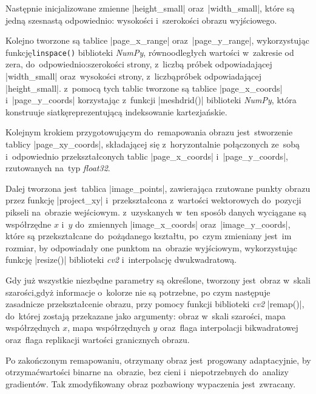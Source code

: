 Następnie inicjalizowane zmienne \pyth|height_small| oraz~\pyth|width_small|, które są jedną szesnastą odpowiednio: wysokości i~szerokości obrazu wyjściowego.

Kolejno tworzone są tablice \pyth|page_x_range| oraz~\pyth|page_y_range|, wykorzystując funkcję\linebreak \lstinline|linspace()| biblioteki \textit{NumPy}, równoodległych wartości w~zakresie od zera, do~odpowiednio:\linebreak szerokości strony, z~liczbą próbek odpowiadającej \pyth|width_small| oraz~wysokości strony, z~liczbą\linebreak próbek odpowiadającej \pyth|height_small|. z~pomocą tych tablic tworzone są tablice \pyth|page_x_coords| i~\pyth|page_y_coords| korzystając z~funkcji \pyth|meshdrid()| biblioteki \textit{NumPy}, która konstruuje siatkę\linebreak reprezentującą indeksowanie kartezjańskie.

Kolejnym krokiem przygotowującym do~remapowania obrazu jest~stworzenie tablicy \linebreak \pyth|page_xy_coords|, składającej się z~horyzontalnie połączonych ze~sobą i~odpowiednio przekształconych tablic \pyth|page_x_coords| i~\pyth|page_y_coords|, rzutowanych na~typ \textit{float32}.

Dalej tworzona jest~tablica \pyth|image_points|, zawierająca rzutowane punkty obrazu przez funkcję \pyth|project_xy| i~przekształcona z~wartości wektorowych do~pozycji pikseli na~obrazie wejściowym. z~uzyskanych w~ten sposób danych wyciągane są współrzędne $x$ i~$y$ do~zmiennych \pyth|image_x_coords| oraz~\pyth|image_y_coords|, które są przekształcane do~pożądanego kształtu, po~czym zmieniany jest~im rozmiar, by odpowiadały one punktom na~obrazie wyjściowym, wykorzystując funkcję \pyth|resize()| biblioteki \textit{cv2} i~interpolację dwukwadratową.

Gdy już wszystkie niezbędne parametry są określone, tworzony jest~obraz w~skali szarości,\linebreak gdyż informacje o~kolorze nie są potrzebne, po czym następuje zasadnicze przekształcenie obrazu, przy pomocy funkcji biblioteki \textit{cv2} \pyth|remap()|, do~której zostają przekazane jako argumenty: obraz w~skali szarości, mapa współrzędnych $x$, mapa współrzędnych $y$ oraz~flaga interpolacji bikwadratowej oraz~flaga replikacji wartości granicznych obrazu.

\newpage

Po zakończonym remapowaniu, otrzymany obraz jest~progowany adaptacyjnie, by otrzymać\linebreak wartości binarne na~obrazie, bez cieni i~niepotrzebnych do~analizy gradientów. Tak zmodyfikowany obraz pozbawiony wypaczenia jest~zwracany.






